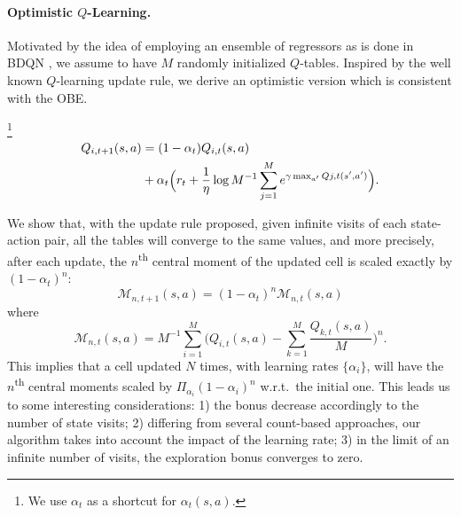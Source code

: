\paragraph{Optimistic $Q$-Learning.}
Motivated by the idea of employing an ensemble of regressors as is done in BDQN \cite{osband2016deep}, we assume to have $M$ randomly initialized $Q$-tables. Inspired by the well known $Q$-learning update rule, we derive an optimistic version which is consistent with the OBE.
\begin{definition}
	\footnote{We use $\alpha_t$ as a shortcut for $\alpha_t(s,a)$.}
	\begin{align*}
		\small  Q_{i, t+1}(s,a) &= (1-\alpha_t)Q_{i,t}(s,a)  \nonumber  \\
	    & \small + \alpha_t \Bigl(r_t + \frac{1}{\eta} \log M^{-1} \sum_{j=1}^M e^{\gamma \max_{a'} Q{j,t}(s', a')}\Bigr).\nonumber
	\end{align*}
	\label{def:optimistic_qlearning}
\end{definition}
\vspace{-1.5em}
We show that, with the update rule proposed, given infinite visits of each state-action pair, all the tables will converge to the same values, and more precisely, after each update, the $n$\textsuperscript{th} central moment of the updated cell is scaled exactly by $(1 - \alpha_t)^n$:
\begin{equation}
	\mathcal{M}_{n,t+1}(s,a) = (1-\alpha_t)^n \mathcal{M}_{n,t}(s,a) \label{momentdecreasing}
\end{equation}
where 
\begin{equation}
	\mathcal{M}_{n,t}(s,a) = M^{-1} \sum_{i=1}^M \bigg(Q_{i,t}(s,a) - \sum_{k=1}^M \frac{Q_{k,t}(s,a)}{M} \bigg)^n. \nonumber
\end{equation}
This implies that a cell updated $N$ times, with learning rates $\{\alpha_i\}$, will have the $n$\textsuperscript{th} central moments scaled by $\Pi_{\alpha_i}(1-\alpha_i)^n$ w.r.t.\ the initial one. This leads us to some interesting considerations: 1) the bonus decrease accordingly to the number of state visits; 2) differing from several count-based approaches, our algorithm takes into account the impact of the learning rate; 3) in the limit of an infinite number of visits, the exploration bonus converges to zero.
